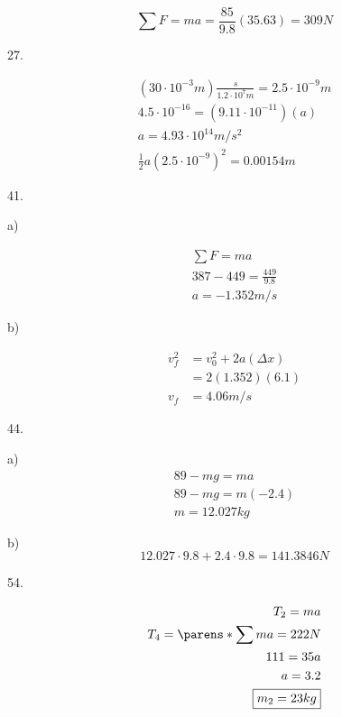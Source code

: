 \documentclass{scrreprt} %
\begin{document}
$$
\sum F = ma = \frac{85}{9.8}(35.63) = \boxed{309N}
$$

27.

\begin{align*}
	(30\cdot 10^{-3} m)\frac{s}{1.2\cdot 10^7 m} = 2.5 \cdot 10^{-9} m \\
	4.5\cdot 10^{-16} = (9.11\cdot 10^{-11})(a) \\
	a = 4.93\cdot 10^{14} m/s^2 \\
	\frac{1}{2} a (2.5\cdot 10^{-9})^2 = \boxed{0.00154 m}
\end{align*}

41.

a)

\begin{align*}
	\sum F = ma \\
	387 - 449 = \frac{449}{9.8} \\
	\boxed{a = -1.352 m/s}
\end{align*}

b)

\begin{align*}
	v_f^2 &= v_0^2 + 2a(\Delta x) \\
		  &= 2(1.352)(6.1) \\
	  v_f &= \boxed{4.06 m/s}
\end{align*}

44.

a) \begin{align*}
	89 - mg = ma \\ 
	89 - mg = m(-2.4) \\
	\boxed{m = 12.027 kg}
\end{align*}

b) $$12.027\cdot 9.8 + 2.4\cdot 9.8 = 141.3846 N$$

54.

\begin{align*}
	T_2 = ma \\
	T_4 = \parens*{{\sum m}}a = 222N \\
	111 = 35a \\
	a = 3.2 \\
	\boxed{m_2 = 23 kg}
\end{align*}
\end{document}
